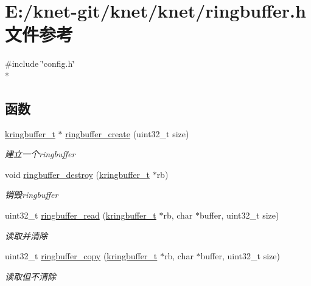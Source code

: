 \hypertarget{a00088}{}\section{E\+:/knet-\/git/knet/knet/ringbuffer.h 文件参考}
\label{a00088}
{\ttfamily \#include \char`\"{}config.\+h\char`\"{}}\\*
\subsection*{函数}
\begin{DoxyCompactItemize}
\item 
\hyperlink{a00053_a66d91f7667db1f0b2983fc25e1a20f1c_a66d91f7667db1f0b2983fc25e1a20f1c}{kringbuffer\+\_\+t} $\ast$ \hyperlink{a00088_a81244fe21f0b4fdcf45e66ae6257afaf_a81244fe21f0b4fdcf45e66ae6257afaf}{ringbuffer\+\_\+create} (uint32\+\_\+t size)
\begin{DoxyCompactList}\small\item\em 建立一个ringbuffer \end{DoxyCompactList}\item 
void \hyperlink{a00088_aa6135df0cc9bc827cae301626898dace_aa6135df0cc9bc827cae301626898dace}{ringbuffer\+\_\+destroy} (\hyperlink{a00053_a66d91f7667db1f0b2983fc25e1a20f1c_a66d91f7667db1f0b2983fc25e1a20f1c}{kringbuffer\+\_\+t} $\ast$rb)
\begin{DoxyCompactList}\small\item\em 销毁ringbuffer \end{DoxyCompactList}\item 
uint32\+\_\+t \hyperlink{a00088_acccb44d353cc569d1f39cf01125c88bf_acccb44d353cc569d1f39cf01125c88bf}{ringbuffer\+\_\+read} (\hyperlink{a00053_a66d91f7667db1f0b2983fc25e1a20f1c_a66d91f7667db1f0b2983fc25e1a20f1c}{kringbuffer\+\_\+t} $\ast$rb, char $\ast$buffer, uint32\+\_\+t size)
\begin{DoxyCompactList}\small\item\em 读取并清除 \end{DoxyCompactList}\item 
uint32\+\_\+t \hyperlink{a00088_a89fdbed1466be114d8200405db2e18a5_a89fdbed1466be114d8200405db2e18a5}{ringbuffer\+\_\+copy} (\hyperlink{a00053_a66d91f7667db1f0b2983fc25e1a20f1c_a66d91f7667db1f0b2983fc25e1a20f1c}{kringbuffer\+\_\+t} $\ast$rb, char $\ast$buffer, uint32\+\_\+t size)
\begin{DoxyCompactList}\small\item\em 读取但不清除 \end{DoxyCompactList}\item 

\end{DoxyCompactItemize}
